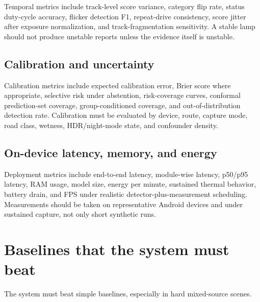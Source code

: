 \documentclass[11pt]{article}
\begin{document}
Temporal metrics include track-level score variance, category flip rate, status duty-cycle accuracy, flicker detection F1, repeat-drive consistency, score jitter after exposure normalization, and track-fragmentation sensitivity. A stable lamp should not produce unstable reports unless the evidence itself is unstable.

\subsection{Calibration and uncertainty}

Calibration metrics include expected calibration error, Brier score where appropriate, selective risk under abstention, risk-coverage curves, conformal prediction-set coverage, group-conditioned coverage, and out-of-distribution detection rate. Calibration must be evaluated by device, route, capture mode, road class, wetness, HDR/night-mode state, and confounder density.

\subsection{On-device latency, memory, and energy}

Deployment metrics include end-to-end latency, module-wise latency, p50/p95 latency, RAM usage, model size, energy per minute, sustained thermal behavior, battery drain, and FPS under realistic detector-plus-measurement scheduling. Measurements should be taken on representative Android devices and under sustained capture, not only short synthetic runs.

\section{Baselines that the system must beat}

The system must beat simple baselines, especially in hard mixed-source scenes.
\end{document}
